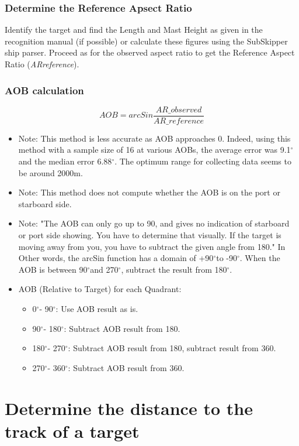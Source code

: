 \documentclass{article}
\newcommand{\degree}{$^{\circ}$}
\begin{document}
\subsubsection{Determine the Reference Apsect Ratio}
Identify the target and find the Length and Mast Height as given in the recognition manual (if possible) or calculate these figures using the SubSkipper ship parser. Proceed as for the observed aspect ratio to get the Reference Aspect Ratio (\emph{ARreference}).

\subsubsection{AOB calculation}
$$AOB = arcSin \frac{AR\_{observed}}{AR\_{reference}}$$

\begin{itemize}
\item{Note: This method is less accurate as AOB approaches 0. Indeed, using this method with a sample size of 16 at various AOBs, the average error was 9.1\degree and the median error 6.88\degree. The optimum range for collecting data seems to be around 2000m.}
\item{Note: This method does not compute whether the AOB is on the port or starboard side.}
\item{Note: "The AOB can only go up to 90, and gives no indication of starboard or port side showing. You have to determine that visually. If the target is moving away from you, you have to subtract the given angle from 180."\cite[p~15]{angrHandB, tvreAcqData} In Other words, the arcSin function has a domain of +90\degree to -90\degree. When the AOB is between 90\degree and 270\degree, subtract the result from 180\degree. \cite{arcSin}}

\item{AOB (Relative to Target) for each Quadrant:}
\begin{itemize}
	\item{0\degree - 90\degree : Use AOB result as is.}
	\item{90\degree - 180\degree : Subtract AOB result 				 from 180.}
	\item{180\degree - 270\degree : Subtract AOB result from 180, subtract result from 360.}
	\item{270\degree - 360\degree : Subtract AOB result from 360.}
	\end{itemize}

\end{itemize}


\section{Determine the distance to the track of a target}
\end{document}
